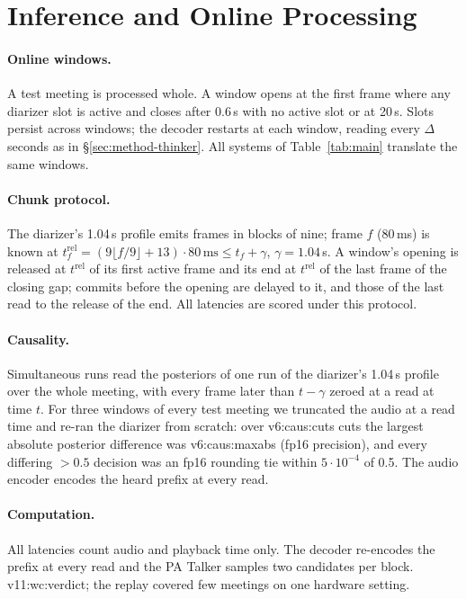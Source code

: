 \section{Inference and Online Processing}
\label{app:online}
\label{app:chunk}
\label{app:causal}

\paragraph{Online windows.} A test meeting is processed whole. A window opens at the first frame where any diarizer
slot is active and closes after 0.6\,s with no active slot or at 20\,s. Slots persist across windows; the decoder
restarts at each window, reading every $\Delta$ seconds as in \S\ref{sec:method-thinker}. All systems of
Table~\ref{tab:main} translate the same windows.

\paragraph{Chunk protocol.} The diarizer's 1.04\,s profile emits frames in blocks of nine; frame $f$ (80\,ms) is known
at $t^{\mathrm{rel}}_f=(9\lfloor f/9\rfloor+13)\cdot 80\,\text{ms}\le t_f+\gamma$, $\gamma=1.04$\,s. A window's opening is
released at $t^{\mathrm{rel}}$ of its first active frame and its end at $t^{\mathrm{rel}}$ of the last frame of the
closing gap; commits before the opening are delayed to it, and those of the last read to the release of the end. All
latencies are scored under this protocol.

\paragraph{Causality.} Simultaneous runs read the posteriors of one run of the diarizer's 1.04\,s profile over the
whole meeting, with every frame later than $t-\gamma$ zeroed at a read at time $t$. For three windows of every test
meeting we truncated the audio at a read time and re-ran the diarizer from scratch: over \num{v6:caus:cuts} cuts the
largest absolute posterior difference was \num{v6:caus:maxabs} (fp16 precision), and every differing $>0.5$ decision
was an fp16 rounding tie within $5\cdot10^{-4}$ of 0.5. The audio encoder encodes the heard prefix at every read.

\paragraph{Computation.} All latencies count audio and playback time only. The decoder re-encodes the prefix at every
read and the PA Talker samples two candidates per block.\ifWallclock{} \num{v11:wc:verdict}; the replay covered few
meetings on one hardware setting.\fi

